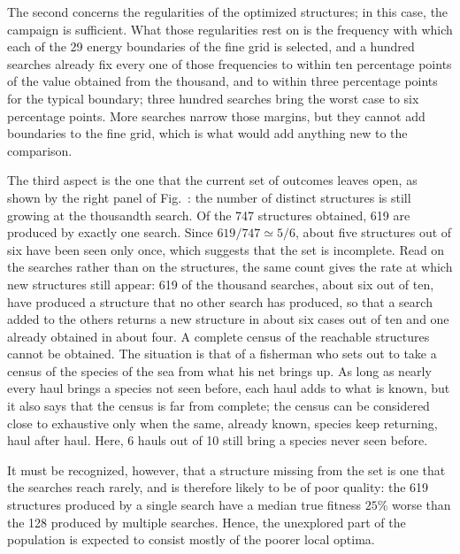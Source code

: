 The second concerns the regularities of the optimized structures; in this
case, the campaign is sufficient. What those regularities rest on is the
frequency with which each of the 29 energy boundaries of the fine grid is
selected, and a hundred searches already fix every one of those frequencies to
within ten percentage points of the value obtained from the thousand, and to
within three percentage points for the typical boundary; three hundred searches
bring the worst case to six percentage points. More searches narrow those
margins, but they cannot add boundaries to the fine grid, which is what would
add anything new to the comparison.

The third aspect is the one that the current set of outcomes leaves open, as
shown by the right panel of Fig.~: the number of distinct
structures is still growing at the thousandth search. Of the 747 structures
obtained, 619 are produced by exactly one search. Since $619/747 \simeq 5/6$,
about five structures out of six have been seen only once, which suggests that
the set is incomplete. Read on the searches rather than on the structures, the
same count gives the rate at which new structures still appear: 619 of the
thousand searches, about six out of ten, have produced a structure that no
other search has produced, so that a search added to the others returns a new
structure in about six cases out of ten and one already obtained in about four.
A complete census of the reachable structures cannot
be obtained. The situation is that of a fisherman who sets out to take a
census of the species of the sea from what his net brings up. As long as nearly
every haul brings a species not seen before, each haul adds to what is known,
but it also says that the census is far from complete; the census can be
considered close to exhaustive only when the same, already known, species keep
returning, haul after haul. Here, 6 hauls out of 10 still bring a species
never seen before.

It must be recognized, however, that a structure missing from the set is one
that the searches reach rarely, and is therefore likely to be of poor quality: the 619 structures produced by a single search
have a median true fitness $25\%$ worse than the 128 produced by multiple
searches. Hence, the unexplored part of the population is expected to consist
mostly of the poorer local optima.

